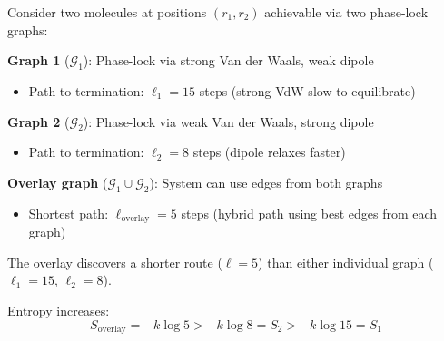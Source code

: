 \documentclass[12pt,a4paper]{article}
\theoremstyle{remark}
\begin{document}
\begin{example}
Consider two molecules at positions $(r_1, r_2)$ achievable via two phase-lock graphs:

\textbf{Graph 1} ($\mathcal{G}_1$): Phase-lock via strong Van der Waals, weak dipole
\begin{itemize}
\item Path to termination: $\ell_1 = 15$ steps (strong VdW slow to equilibrate)
\end{itemize}

\textbf{Graph 2} ($\mathcal{G}_2$): Phase-lock via weak Van der Waals, strong dipole
\begin{itemize}
\item Path to termination: $\ell_2 = 8$ steps (dipole relaxes faster)
\end{itemize}

\textbf{Overlay graph} ($\mathcal{G}_1 \cup \mathcal{G}_2$): System can use edges from both graphs
\begin{itemize}
\item Shortest path: $\ell_{\text{overlay}} = 5$ steps (hybrid path using best edges from each graph)
\end{itemize}

The overlay discovers a shorter route ($\ell = 5$) than either individual graph ($\ell_1 = 15$, $\ell_2 = 8$).

Entropy increases:
\begin{equation}
S_{\text{overlay}} = -k \log 5 > -k \log 8 = S_2 > -k \log 15 = S_1
\end{equation}
\end{example}
\end{document}
